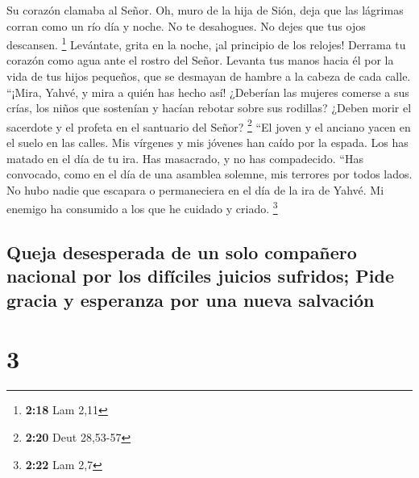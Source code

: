  Su corazón clamaba al Señor. Oh, muro de la hija de
Sión, deja que las lágrimas corran como un río día y noche. No te
desahogues. No dejes que tus ojos descansen. \footnote{\textbf{2:18} Lam
  2,11}  Levántate, grita en la noche, ¡al principio de
los relojes! Derrama tu corazón como agua ante el rostro del Señor.
Levanta tus manos hacia él por la vida de tus hijos pequeños, que se
desmayan de hambre a la cabeza de cada calle.  ``¡Mira,
Yahvé, y mira a quién has hecho así! ¿Deberían las mujeres comerse a sus
crías, los niños que sostenían y hacían rebotar sobre sus rodillas?
¿Deben morir el sacerdote y el profeta en el santuario del Señor?
\footnote{\textbf{2:20} Deut 28,53-57}  ``El joven y el
anciano yacen en el suelo en las calles. Mis vírgenes y mis jóvenes han
caído por la espada. Los has matado en el día de tu ira. Has masacrado,
y no has compadecido.  ``Has convocado, como en el día de
una asamblea solemne, mis terrores por todos lados. No hubo nadie que
escapara o permaneciera en el día de la ira de Yahvé. Mi enemigo ha
consumido a los que he cuidado y criado. \footnote{\textbf{2:22} Lam 2,7}

\hypertarget{queja-desesperada-de-un-solo-compauxf1ero-nacional-por-los-difuxedciles-juicios-sufridos-pide-gracia-y-esperanza-por-una-nueva-salvaciuxf3n}{%
\subsection{Queja desesperada de un solo compañero nacional por los
difíciles juicios sufridos; Pide gracia y esperanza por una nueva
salvación}\label{queja-desesperada-de-un-solo-compauxf1ero-nacional-por-los-difuxedciles-juicios-sufridos-pide-gracia-y-esperanza-por-una-nueva-salvaciuxf3n}}

\hypertarget{section-2}{%
\section{3}\label{section-2}}

